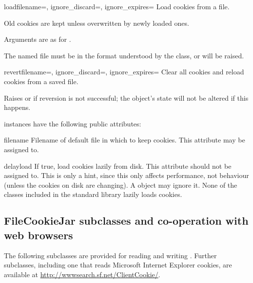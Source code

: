 \begin{methoddesc}[FileCookieJar]{load}{filename=,
    ignore_discard=, ignore_expires=}
Load cookies from a file.

Old cookies are kept unless overwritten by newly loaded ones.

Arguments are as for .

The named file must be in the format understood by the class, or
 will be raised.
\end{methoddesc}

\begin{methoddesc}[FileCookieJar]{revert}{filename=,
    ignore_discard=, ignore_expires=}
Clear all cookies and reload cookies from a saved file.

Raises  or  if
reversion is not successful; the object's state will not be altered if
this happens.
\end{methoddesc}

 instances have the following public attributes:

\begin{memberdesc}{filename}
Filename of default file in which to keep cookies.  This attribute may
be assigned to.
\end{memberdesc}

\begin{memberdesc}{delayload}
If true, load cookies lazily from disk.  This attribute should not be
assigned to.  This is only a hint, since this only affects
performance, not behaviour (unless the cookies on disk are changing).
A  object may ignore it.  None of the
 classes included in the standard library lazily
loads cookies.
\end{memberdesc}


\subsection{FileCookieJar subclasses and co-operation with web browsers
  \label{file-cookie-jar-classes}}

The following  subclasses are provided for reading
and writing .  Further  subclasses, including one
that reads Microsoft Internet Explorer cookies, are available at
\url{http://wwwsearch.sf.net/ClientCookie/}.

